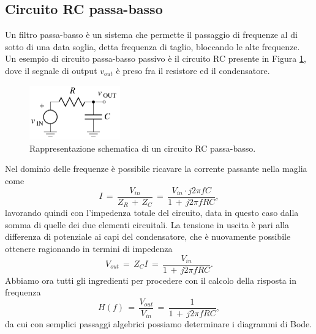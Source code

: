 \subsection{Circuito RC passa-basso}

Un filtro passa-basso è un sistema che permette il passaggio di frequenze al di sotto di una data soglia, detta frequenza
di taglio, bloccando le alte frequenze. Un esempio di circuito passa-basso passivo è il circuito RC presente in Figura
\ref{figure: RC_PassaBasso}, dove il segnale di output $v_{out}$ è preso fra il resistore ed il condensatore. 
\begin{figure}[H]
    \centering
    \includegraphics[width=0.35\textwidth]{Immagini/RC_PassaBasso.png}
    \caption{Rappresentazione schematica di un circuito RC passa-basso.}
    \label{figure: RC_PassaBasso}
\end{figure}
Nel dominio delle frequenze è possibile ricavare la corrente passante nella maglia come
\begin{equation}
    I\,=\,\frac{V_{in}}{Z_R\,+\,Z_C}\,=\,\frac{V_{in} \cdot j2\pi fC}{1\,+\,j2\pi fRC},
    \label{equation: corrente_RC_PB}
\end{equation}
lavorando quindi con l'impedenza totale del circuito, data in questo caso dalla somma di quelle dei due elementi circuitali.
La tensione in uscita è pari alla differenza di potenziale ai capi del condensatore, che è nuovamente possibile ottenere
ragionando in termini di impedenza
\begin{equation}
    V_{out}\,=\,Z_CI\,=\,\frac{V_{in}}{1\,+\,j2\pi fRC}.
    \label{equation: Vout_RC_PB}
\end{equation}
Abbiamo ora tutti gli ingredienti per procedere con il calcolo della risposta in frequenza
\begin{equation}
    H\left(f\right)\,=\,\frac{V_{out}}{V_{in}}\,=\,\frac{1}{1\,+\,j2\pi fRC},
    \label{equation: Risposta_RC_PB}
\end{equation}
da cui con semplici passaggi algebrici possiamo determinare i diagrammi di Bode.
